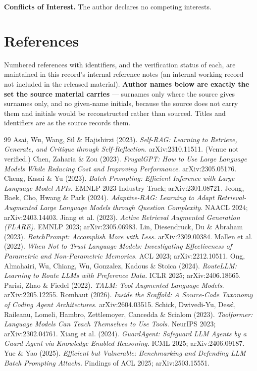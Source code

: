 \documentclass[11pt,a4paper]{article}
\begin{document}
\textbf{Conflicts of Interest.} The author declares no competing interests.

\section*{References}
Numbered references with identifiers, and the verification status of each, are maintained in this record's internal reference notes (an internal working record not included in the released material). \textbf{Author names below are exactly the set the source material carries} --- surnames only where the source gives surnames only, and no given-name initials, because the source does not carry them and initials would be reconstructed rather than sourced. Titles and identifiers are as the source records them.

\renewcommand{\refname}{}   %
\begin{thebibliography}{99}
 Asai, Wu, Wang, Sil \& Hajishirzi (2023). \emph{Self-RAG: Learning to Retrieve, Generate, and Critique through Self-Reflection.} arXiv:2310.11511. (Venue not verified.)
 Chen, Zaharia \& Zou (2023). \emph{FrugalGPT: How to Use Large Language Models While Reducing Cost and Improving Performance.} arXiv:2305.05176.
 Cheng, Kasai \& Yu (2023). \emph{Batch Prompting: Efficient Inference with Large Language Model APIs.} EMNLP 2023 Industry Track; arXiv:2301.08721.
 Jeong, Baek, Cho, Hwang \& Park (2024). \emph{Adaptive-RAG: Learning to Adapt Retrieval-Augmented Large Language Models through Question Complexity.} NAACL 2024; arXiv:2403.14403.
 Jiang et al. (2023). \emph{Active Retrieval Augmented Generation (FLARE).} EMNLP 2023; arXiv:2305.06983.
 Lin, Diesendruck, Du \& Abraham (2023). \emph{BatchPrompt: Accomplish More with Less.} arXiv:2309.00384.
 Mallen et al. (2022). \emph{When Not to Trust Language Models: Investigating Effectiveness of Parametric and Non-Parametric Memories.} ACL 2023; arXiv:2212.10511.
 Ong, Almahairi, Wu, Chiang, Wu, Gonzalez, Kadous \& Stoica (2024). \emph{RouteLLM: Learning to Route LLMs with Preference Data.} ICLR 2025; arXiv:2406.18665.
 Parisi, Zhao \& Fiedel (2022). \emph{TALM: Tool Augmented Language Models.} arXiv:2205.12255.
 Rombaut (2026). \emph{Inside the Scaffold: A Source-Code Taxonomy of Coding Agent Architectures.} arXiv:2604.03515.
 Schick, Dwivedi-Yu, Dess\`i, Raileanu, Lomeli, Hambro, Zettlemoyer, Cancedda \& Scialom (2023). \emph{Toolformer: Language Models Can Teach Themselves to Use Tools.} NeurIPS 2023; arXiv:2302.04761.
 Xiang et al. (2024). \emph{GuardAgent: Safeguard LLM Agents by a Guard Agent via Knowledge-Enabled Reasoning.} ICML 2025; arXiv:2406.09187.
 Yue \& Yao (2025). \emph{Efficient but Vulnerable: Benchmarking and Defending LLM Batch Prompting Attacks.} Findings of ACL 2025; arXiv:2503.15551.
\end{thebibliography}
\end{document}
